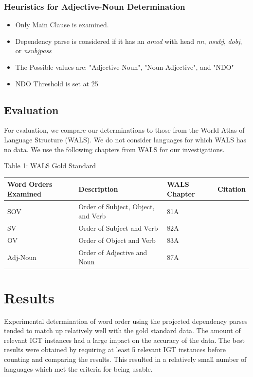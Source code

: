 \documentclass[]{aiaa-tc}
\begin{document}
\subsubsection{Heuristics for Adjective-Noun Determination}
\begin{itemize}
    \item Only Main Clause is examined.
    \item Dependency parse is considered if it has an \textit{amod} with head \textit{nn}, \textit{nsubj}, \textit{dobj}, or \textit{nsubjpass}
    \item The Possible values are: "Adjective-Noun", "Noun-Adjective", and "NDO"
    \item NDO Threshold is set at 25%
\end{itemize}
  
\subsection{Evaluation}
For evaluation, we compare our determinations to those from the World Atlas of Language Structure (WALS).  We do not consider languages for which WALS has no data.  We use the following chapters from WALS for our investigations.  

\begin{center}
Table 1: WALS Gold Standard
\end{center}
\begin{flushleft}
\begin{tabularx}{\textwidth}{|l|X|l|l|}
\hline
  \textbf{Word Orders Examined} & \textbf{Description} & \textbf{WALS Chapter} & \textbf{Citation} \\
\hline
SOV      & Order of Subject, Object, and Verb & 81A & \cite{wals-81}\\
\hline
SV       & Order of Subject and Verb          & 82A & \cite{wals-82}\\
\hline
OV       & Order of Object and Verb           & 83A & \cite{wals-83}\\
\hline
Adj-Noun & Order of Adjective and Noun        & 87A & \cite{wals-87}\\
\hline
\end{tabularx}
\end{flushleft}
\vspace{0.6cm}


\section{Results}
Experimental determination of word order using the projected dependency parses tended to match up relatively well with the gold standard data.  The amount of relevant IGT instances had a large impact on the accuracy of the data.  The best results were obtained by requiring at least 5 relevant IGT instances before counting and comparing the results.  This resulted in a relatively small number of languages which met the criteria for being usable.
\end{document}
